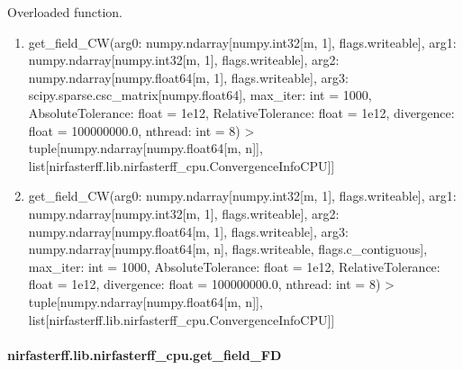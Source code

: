 \documentclass[letterpaper,10pt,english]{sphinxmanual}
\begin{document}
\begin{fulllineitems}
\label{\detokenize{_autosummary/nirfasterff.lib.nirfasterff_cpu.get_field_CW:nirfasterff.lib.nirfasterff_cpu.get_field_CW}}
\pysigstartsignatures
\pysiglinewithargsret
{}
{\sphinxparamcomma {}}
{}
\pysigstopsignatures
\sphinxAtStartPar
Overloaded function.
\begin{enumerate}
%
\item {} 
\sphinxAtStartPar
get\_field\_CW(arg0: numpy.ndarray{[}numpy.int32{[}m, 1{]}, flags.writeable{]}, arg1: numpy.ndarray{[}numpy.int32{[}m, 1{]}, flags.writeable{]}, arg2: numpy.ndarray{[}numpy.float64{[}m, 1{]}, flags.writeable{]}, arg3: scipy.sparse.csc\_matrix{[}numpy.float64{]}, max\_iter: int = 1000, AbsoluteTolerance: float = 1e\sphinxhyphen{}12, RelativeTolerance: float = 1e\sphinxhyphen{}12, divergence: float = 100000000.0, nthread: int = 8) \sphinxhyphen{}\textgreater{} tuple{[}numpy.ndarray{[}numpy.float64{[}m, n{]}{]}, list{[}nirfasterff.lib.nirfasterff\_cpu.ConvergenceInfoCPU{]}{]}

\item {} 
\sphinxAtStartPar
get\_field\_CW(arg0: numpy.ndarray{[}numpy.int32{[}m, 1{]}, flags.writeable{]}, arg1: numpy.ndarray{[}numpy.int32{[}m, 1{]}, flags.writeable{]}, arg2: numpy.ndarray{[}numpy.float64{[}m, 1{]}, flags.writeable{]}, arg3: numpy.ndarray{[}numpy.float64{[}m, n{]}, flags.writeable, flags.c\_contiguous{]}, max\_iter: int = 1000, AbsoluteTolerance: float = 1e\sphinxhyphen{}12, RelativeTolerance: float = 1e\sphinxhyphen{}12, divergence: float = 100000000.0, nthread: int = 8) \sphinxhyphen{}\textgreater{} tuple{[}numpy.ndarray{[}numpy.float64{[}m, n{]}{]}, list{[}nirfasterff.lib.nirfasterff\_cpu.ConvergenceInfoCPU{]}{]}

\end{enumerate}

\end{fulllineitems}


\sphinxstepscope


\paragraph{nirfasterff.lib.nirfasterff\_cpu.get\_field\_FD}
\label{\detokenize{_autosummary/nirfasterff.lib.nirfasterff_cpu.get_field_FD:nirfasterff-lib-nirfasterff-cpu-get-field-fd}}\label{\detokenize{_autosummary/nirfasterff.lib.nirfasterff_cpu.get_field_FD::doc}}
\end{document}
